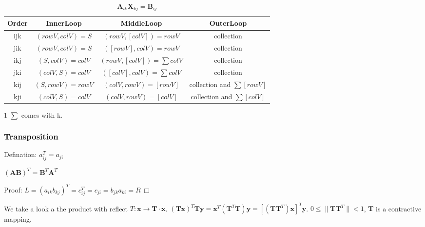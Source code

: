 \documentclass[UTF8]{../../09-Mathematics}
\begin{document}
\begin{table}[htbp]
    \newcommand{\tabincell}[2]{\begin{tabular}{@{}#1@{}}#2\end
    {tabular}}
    \centering
    \begin{threeparttable}
    \caption{$\boldsymbol A_{ik} \boldsymbol X_{kj} = \boldsymbol B_{ij}$ }
    \label{tab:label}
    \begin{tabular}{cccc}
        \toprule
        Order & InnerLoop & MiddleLoop & OuterLoop \\
        \midrule
        ijk & $(rowV, colV) = S$ & $(rowV, [colV]) = rowV$ & collection \\
        jik & $(rowV, colV) = S$ & $([rowV], colV) = rowV$ & collection \\

        ikj & $(S, colV) = colV$ & $(rowV, [colV]) = \sum colV$ & collection \\
        jki& $(colV, S) = colV$ & $([colV], colV) = \sum colV$ & collection \\

        kij& $(S, rowV) = rowV$ & $(colV, rowV) = [rowV] $ & collection and $\sum [rowV] $ \\
        kji& $(colV, S) = colV$ & $(colV, rowV) = [colV] $ & collection and $\sum [colV] $ \\
        \bottomrule
    \end{tabular}
    \begin{tablenotes}
        \item[1] $\sum$ comes with k.
      \end{tablenotes}
    \end{threeparttable}
\end{table}






\subsubsection{Transposition}


Defination: $a_{ij}^T = a_{ji}$

\begin{proposition}
    $(\boldsymbol {AB})^T = \boldsymbol B ^T \boldsymbol A^T$

    Proof: $L = (a_{ik}b_{kj})^T = c_{ij}^T = c_{ji} = b_{jk}a_{ki} = R \ \Box$
\end{proposition}

\begin{proposition}
    We take a look a the product with reflect $T : \boldsymbol x \rightarrow  \boldsymbol{T} \cdot \boldsymbol{x}$.
    $(\boldsymbol {Tx})^T \boldsymbol {Ty} = \boldsymbol x^T(\boldsymbol T^T \boldsymbol T) \boldsymbol y = [(\boldsymbol T \boldsymbol T^T) \boldsymbol x]^T \boldsymbol y$. $0 \leqslant \|\boldsymbol T \boldsymbol T^T\| < 1$, $\boldsymbol T$ is a contractive mapping.
\end{proposition}
\end{document}

